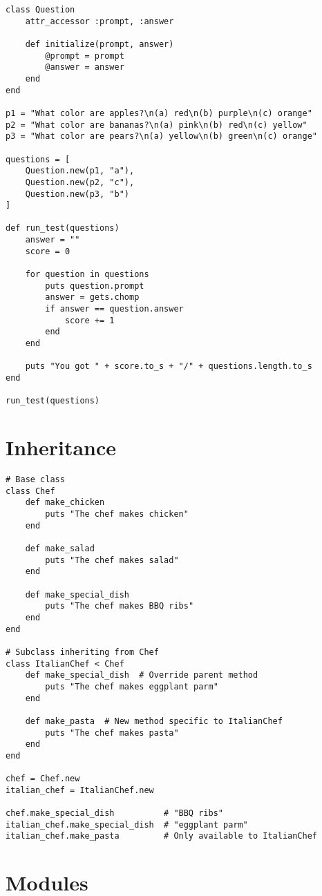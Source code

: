 \documentclass[12pt,a4paper]{article}
\begin{document}
\begin{lstlisting}
class Question
    attr_accessor :prompt, :answer
    
    def initialize(prompt, answer)
        @prompt = prompt
        @answer = answer
    end
end

p1 = "What color are apples?\n(a) red\n(b) purple\n(c) orange"
p2 = "What color are bananas?\n(a) pink\n(b) red\n(c) yellow"
p3 = "What color are pears?\n(a) yellow\n(b) green\n(c) orange"

questions = [
    Question.new(p1, "a"),
    Question.new(p2, "c"),
    Question.new(p3, "b")
]

def run_test(questions)
    answer = ""
    score = 0
    
    for question in questions
        puts question.prompt
        answer = gets.chomp
        if answer == question.answer
            score += 1
        end
    end
    
    puts "You got " + score.to_s + "/" + questions.length.to_s
end

run_test(questions)
\end{lstlisting}

\section{Inheritance}

\begin{lstlisting}
# Base class
class Chef
    def make_chicken
        puts "The chef makes chicken"
    end
    
    def make_salad
        puts "The chef makes salad"
    end
    
    def make_special_dish
        puts "The chef makes BBQ ribs"
    end
end

# Subclass inheriting from Chef
class ItalianChef < Chef
    def make_special_dish  # Override parent method
        puts "The chef makes eggplant parm"
    end
    
    def make_pasta  # New method specific to ItalianChef
        puts "The chef makes pasta"
    end
end

chef = Chef.new
italian_chef = ItalianChef.new

chef.make_special_dish          # "BBQ ribs"
italian_chef.make_special_dish  # "eggplant parm"
italian_chef.make_pasta         # Only available to ItalianChef
\end{lstlisting}

\section{Modules}
\end{document}

